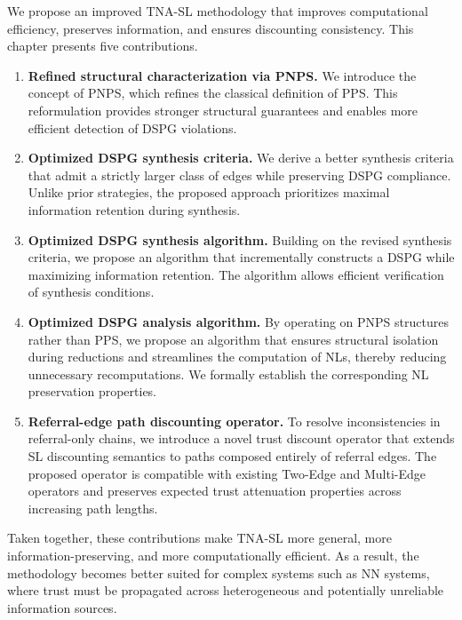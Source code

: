 We propose an improved \ac{TNA-SL} methodology that improves computational efficiency, preserves information, and ensures discounting consistency. This chapter presents five contributions.
\begin{enumerate}
    \item \textbf{Refined structural characterization via \ac{PNPS}.} We introduce the concept of \acf{PNPS}, which refines the classical definition of \acf{PPS}. This reformulation provides stronger structural guarantees and enables more efficient detection of \ac{DSPG} violations.

    \item \textbf{Optimized \ac{DSPG} synthesis criteria.} We derive a better synthesis criteria that admit a strictly larger class of edges while preserving \ac{DSPG} compliance. Unlike prior strategies, the proposed approach prioritizes maximal information retention during synthesis.

    \item \textbf{Optimized \ac{DSPG} synthesis algorithm.}
    Building on the revised synthesis criteria, we propose an algorithm that incrementally constructs a \ac{DSPG} while maximizing information retention. The algorithm allows efficient verification of synthesis conditions.

    \item \textbf{Optimized \ac{DSPG} analysis algorithm.}
    By operating on \ac{PNPS} structures rather than \ac{PPS}, we propose an algorithm that ensures structural isolation during reductions and streamlines the computation of \acp{NL}, thereby reducing unnecessary recomputations. We formally establish the corresponding \ac{NL} preservation properties.
    
    \item \textbf{Referral-edge path discounting operator.} To resolve inconsistencies in referral-only chains, we introduce a novel trust discount operator that extends \ac{SL} discounting semantics to paths composed entirely of referral edges. The proposed operator is compatible with existing Two-Edge and Multi-Edge operators and preserves expected trust attenuation properties across increasing path lengths.
\end{enumerate}
Taken together, these contributions make \ac{TNA-SL} more general, more information-preserving, and more computationally efficient. As a result, the methodology becomes better suited for complex systems such as \ac{NN} systems, where trust must be propagated across heterogeneous and potentially unreliable information sources.

